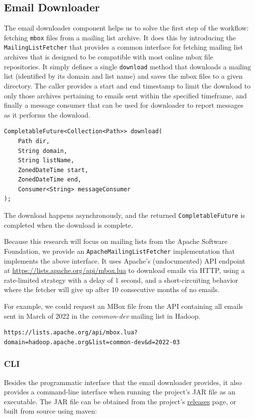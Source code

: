 \documentclass[a4paper, 12pt]{article}
\begin{document}
	\subsection{Email Downloader}
		\label{sec:email-downloader}
		The email downloader component helps us to solve the first step of the workflow: fetching \texttt{mbox} files from a mailing list archive. It does this by introducing the \texttt{MailingListFetcher} that provides a common interface for fetching mailing list archives that is designed to be compatible with most online mbox file repositories. It simply defines a single \texttt{download} method that downloads a mailing list (identified by its domain and list name) and saves the mbox files to a given directory. The caller provides a start and end timestamp to limit the download to only those archives pertaining to emails sent within the specified timeframe, and finally a message consumer that can be used for downloader to report messages as it performs the download.
		
		\begin{verbatim}
CompletableFuture<Collection<Path>> download(
	Path dir,
	String domain,
	String listName,
	ZonedDateTime start,
	ZonedDateTime end,
	Consumer<String> messageConsumer
);
		\end{verbatim}
	
		The download happens asynchronously, and the returned \texttt{CompletableFuture} is completed when the download is complete.
		
		Because this research will focus on mailing lists from the Apache Software Foundation, we provide an \texttt{ApacheMailingListFetcher} implementation that implements the above interface. It uses Apache's (undocumented) API endpoint at \href{https://lists.apache.org/api/mbox.lua}{https://lists.apache.org/api/mbox.lua} to download emails via HTTP, using a rate-limited strategy with a delay of 1 second, and a short-circuiting behavior where the fetcher will give up after 10 consecutive months of no emails.
		
		For example, we could request an MBox file from the API containing all emails sent in March of 2022 in the \textit{common-dev} mailing list in Hadoop.
		
		\begin{verbatim}
https://lists.apache.org/api/mbox.lua?domain=hadoop.apache.org&list=common-dev&d=2022-03
		\end{verbatim}
		
		\subsubsection{CLI}
			Besides the programmatic interface that the email downloader provides, it also provides a command-line interface when running the project's JAR file as an executable. The JAR file can be obtained from the project's \href{https://github.com/ArchitecturalKnowledgeAnalysis/EmailDownloader/releases}{releases} page, or built from source using maven:
			
\end{document}
